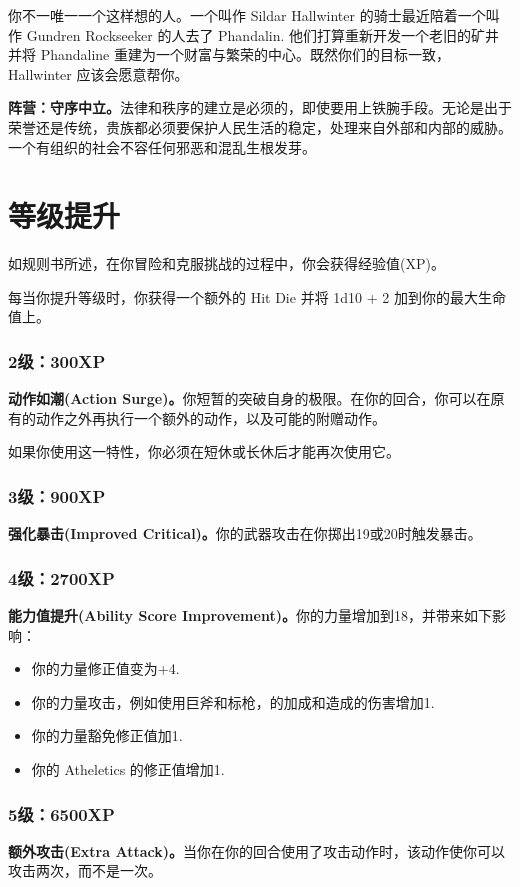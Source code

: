 \documentclass[letterpaper,twocolumn,openany,nodeprecatedcode]{dndbook}
\begin{document}
你不一唯一一个这样想的人。一个叫作 Sildar Hallwinter 的骑士最近陪着一个叫作 Gundren Rockseeker 的人去了 Phandalin. 他们打算重新开发一个老旧的矿井并将 Phandaline 重建为一个财富与繁荣的中心。既然你们的目标一致， Hallwinter 应该会愿意帮你。

\textbf{阵营：守序中立。}法律和秩序的建立是必须的，即使要用上铁腕手段。无论是出于荣誉还是传统，贵族都必须要保护人民生活的稳定，处理来自外部和内部的威胁。一个有组织的社会不容任何邪恶和混乱生根发芽。

\section{等级提升}

如规则书所述，在你冒险和克服挑战的过程中，你会获得经验值(XP)。

每当你提升等级时，你获得一个额外的 Hit Die 并将 1d10 + 2 加到你的最大生命值上。

\subsubsection{2级：300XP}

\textbf{动作如潮(Action Surge)。}你短暂的突破自身的极限。在你的回合，你可以在原有的动作之外再执行一个额外的动作，以及可能的附赠动作。

如果你使用这一特性，你必须在短休或长休后才能再次使用它。

\subsubsection{3级：900XP}
\textbf{强化暴击(Improved Critical)。}你的武器攻击在你掷出19或20时触发暴击。

\subsubsection{4级：2700XP}
\textbf{能力值提升(Ability Score Improvement)。}你的力量增加到18，并带来如下影响：
\begin{itemize}
\item 你的力量修正值变为+4.
\item 你的力量攻击，例如使用巨斧和标枪，的加成和造成的伤害增加1.
\item 你的力量豁免修正值加1.
\item 你的 Atheletics 的修正值增加1.
\end{itemize}

\subsubsection{5级：6500XP}
\textbf{额外攻击(Extra Attack)。}当你在你的回合使用了攻击动作时，该动作使你可以攻击两次，而不是一次。
\end{document}

